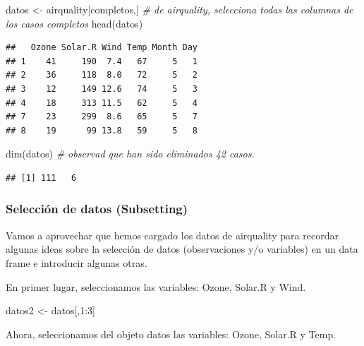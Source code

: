 \documentclass[
]{book}
\newenvironment{Shaded}{\begin{snugshade}}{\end{snugshade}}
\newcommand{\CommentTok}[1]{\textcolor[rgb]{0.56,0.35,0.01}{\textit{#1}}}
\newcommand{\DecValTok}[1]{\textcolor[rgb]{0.00,0.00,0.81}{#1}}
\newcommand{\FunctionTok}[1]{\textcolor[rgb]{0.00,0.00,0.00}{#1}}
\newcommand{\NormalTok}[1]{#1}
\newcommand{\OtherTok}[1]{\textcolor[rgb]{0.56,0.35,0.01}{#1}}
\newcommand{\SpecialCharTok}[1]{\textcolor[rgb]{0.00,0.00,0.00}{#1}}
\begin{document}
\begin{Shaded}
\begin{Highlighting}[]
\NormalTok{datos }\OtherTok{\textless{}{-}}\NormalTok{ airquality[completos,] }\CommentTok{\# de airquality, selecciona todas las columnas de los casos completos }
\FunctionTok{head}\NormalTok{(datos)}
\end{Highlighting}
\end{Shaded}

\begin{verbatim}
##   Ozone Solar.R Wind Temp Month Day
## 1    41     190  7.4   67     5   1
## 2    36     118  8.0   72     5   2
## 3    12     149 12.6   74     5   3
## 4    18     313 11.5   62     5   4
## 7    23     299  8.6   65     5   7
## 8    19      99 13.8   59     5   8
\end{verbatim}

\begin{Shaded}
\begin{Highlighting}[]
\FunctionTok{dim}\NormalTok{(datos) }\CommentTok{\# observad que han sido eliminados 42 casos.}
\end{Highlighting}
\end{Shaded}

\begin{verbatim}
## [1] 111   6
\end{verbatim}

\hypertarget{selecciuxf3n-de-datos-subsetting}{%
\subsubsection{Selección de datos (Subsetting)}\label{selecciuxf3n-de-datos-subsetting}}

Vamos a aprovechar que hemos cargado los datos de airquality para recordar algunas ideas sobre la selección de datos (observaciones y/o variables) en un data frame e introducir algunas otras.

En primer lugar, seleccionamos las variables: Ozone, Solar.R y Wind.

\begin{Shaded}
\begin{Highlighting}[]
\NormalTok{datos2 }\OtherTok{\textless{}{-}}\NormalTok{ datos[,}\DecValTok{1}\SpecialCharTok{:}\DecValTok{3}\NormalTok{]}
\end{Highlighting}
\end{Shaded}

Ahora, seleccionamos del objeto datos las variables: Ozone, Solar.R y Temp.
\end{document}
